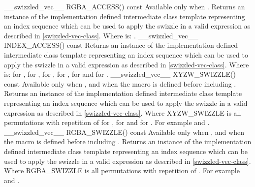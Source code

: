   \addRow
    {\__swizzled_vec__ RGBA_ACCESS() const}
    {
      Available only when .
      \newline \newline
      Returns an instance of the implementation defined intermediate class template  representing an index sequence which can be used to apply the swizzle in a valid expression as described in \ref{swizzled-vec-class}.
      \newline \newline
      Where  is: .
    }
  \addRow
    {\__swizzled_vec__ INDEX_ACCESS() const}
    {
      Returns an instance of the implementation defined intermediate class template  representing an index sequence which can be used to apply the swizzle in a valid expression as described in \ref{swizzled-vec-class}.
      \newline \newline
      Where  is:  for ,  for ,  for ,  for ,  for  and  for .
    }
  \addRow
    {\__swizzled_vec__ XYZW_SWIZZLE() const}
    {
      Available only when , and when the macro  is defined before including .
      \newline \newline
      Returns an instance of the implementation defined intermediate class template  representing an index sequence which can be used to apply the swizzle in a valid expression as described in \ref{swizzled-vec-class}.
    \newline \newline
    Where XYZW\_SWIZZLE is all permutations with repetition of  for ,  for  and  for . For example  and .
    }
  \addRow
    {\__swizzled_vec__ RGBA_SWIZZLE() const}
    {
      Available only when , and when the macro  is defined before including .
      \newline \newline
      Returns an instance of the implementation defined intermediate class template  representing an index sequence which can be used to apply the swizzle in a valid expression as described in \ref{swizzled-vec-class}.
    \newline \newline
    Where RGBA\_SWIZZLE is all permutations with repetition of . For example  and .
    }
